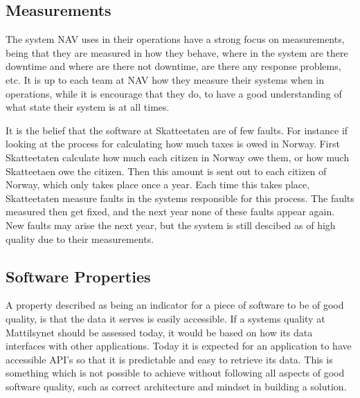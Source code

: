 \subsection{Measurements}
The system NAV uses in their operations have a strong focus on measurements, being that they are measured in how they behave, where in the system are there downtime and where are there not downtime, are there any response problems, etc. It is up to each team at NAV how they measure their systems when in operations, while it is encourage that they do, to have a good understanding of what state their system is at all times.

It is the belief that the software at Skatteetaten are of few faults. For instance if looking at the process for calculating how much taxes is owed in Norway. First Skatteetaten calculate how much each citizen in Norway owe them, or how much Skatteetaen owe the citizen. Then this amount is sent out to each citizen of Norway, which only takes place once a year. Each time this takes place, Skatteetaten measure faults in the systems responsible for this process. The faults measured then get fixed, and the next year none of these faults appear again. New faults may arise the next year, but the system is still descibed as of high quality due to their measurements.



\subsection{Software Properties}
A property described as being an indicator for a piece of software to be of good quality, is that the data it serves is easily accessible. If a systems quality at Mattilsynet should be assessed today, it would be based on how its data interfaces with other applications. Today it is expected for an application to have accessible API's so that it is predictable and easy to retrieve its data. This is something which is not possible to achieve without following all aspects of good software quality, such as correct architecture and mindset in building a solution.

